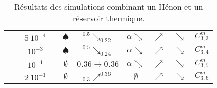 \begin{table}[htbp]
\begin{tabular}{|c|c|c|c|c|c|c|c|c|c|}
					& & $5\ 10^{-4}$ & \accretionlot{} & $\spadesuit$ & ${}^{0.5}\searrow_{0.22}$ & $\alpha\searrow$ & $\nearrow$ & $\searrow$ & $C_{3,3}^m$  \tabularnewline \cline{3-10}
					& & $10^{-3}$ & \accretionlot{} & $\spadesuit$ & ${}^{0.5}\searrow_{0.24}$ & $\alpha\searrow$ & $\nearrow$ & $\searrow$ & $C_{3,4}^m$  \tabularnewline \cline{3-10}
					& & $10^{-1}$ & \accretionlot{} & $\emptyset$ & ${\scriptstyle 0.36}\to{\scriptstyle 0.36}$ & $\alpha\searrow$ & $\nearrow$ & $\searrow$ & $C_{3,5}^m$  \tabularnewline \cline{3-10}
					& & $2\ 10^{-1}$ & \accretionlot{} & $\emptyset$ & ${}_{0.3}\nearrow^{0.36}$ & $\emptyset$ & $\nearrow$ & $\searrow$ & $C_{3,6}^m$  \tabularnewline \cline{2-10}
			\hline
		\end{tabular}
	\caption{Résultats des simulations combinant un Hénon et un réservoir thermique.\label{Tab::SimuZoomRes}}
\end{table}

